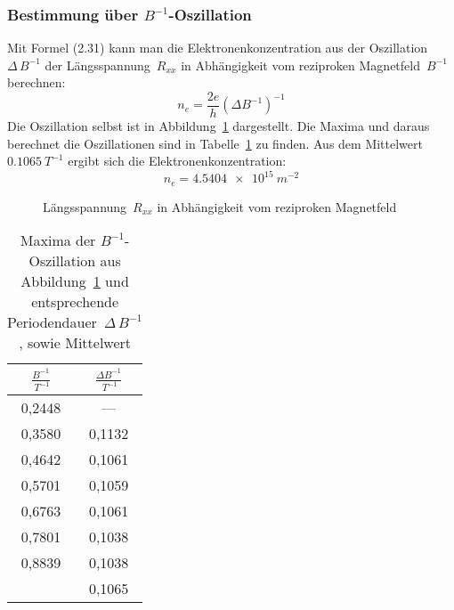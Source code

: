 \documentclass[a4paper]{article}
\begin{document}
\pagebreak

\subsubsection*{Bestimmung über $B^{-1}$-Oszillation}
Mit Formel (2.31) \citet{Bockhorn}
kann man die Elektronenkonzentration aus der
Oszillation~$\Delta\,B^{-1}$
der Längsspannung~$R_{xx}$ in Abhängigkeit vom
reziproken Magnetfeld~$B^{-1}$ berechnen:
\begin{equation}
n_e = \frac{2e}{h}\left(\Delta B^{-1}\right)^{-1}
\label{eq:elektronen_osz}
\end{equation}
Die Oszillation selbst ist in Abbildung~\ref{fig:elektronen_osz}
dargestellt.
Die Maxima und daraus berechnet die Oszillationen
sind in Tabelle~\ref{tbl:elektronen_osz} zu finden.
Aus dem Mittelwert $\SI{0.1065}{T^{-1}}$ ergibt sich
die Elektronenkonzentration:
\begin{equation*} n_e = \SI{4,5404e15}{m^{-2}} \end{equation*}

\begin{figure}[h!]
\begin{center}

\end{center}
\caption{Längsspannung~$R_{xx}$ in Abhängigkeit vom
reziproken Magnetfeld}
\label{fig:elektronen_osz}
\end{figure}

\begin{table}[h!]
\begin{center}
\begin{tabular}{cc}
\toprule
$\frac{B^{-1}}{\SI{}{T^{-1}}}$ &
$\frac{\Delta B^{-1}}{\SI{}{T^{-1}}}$ \\
\midrule
0,2448 & —\\
0,3580 & 0,1132 \\
0,4642 & 0,1061 \\
0,5701 & 0,1059 \\
0,6763 & 0,1061 \\
0,7801 & 0,1038 \\
0,8839 & 0,1038 \\
\bottomrule
& 0,1065
\end{tabular}
\end{center}
\caption{Maxima der $B^{-1}$-Oszillation aus
Abbildung~\ref{fig:elektronen_osz}
und
entsprechende Periodendauer~$\Delta\,B^{-1}$,
sowie Mittelwert}
\label{tbl:elektronen_osz}
\end{table}
\end{document}
